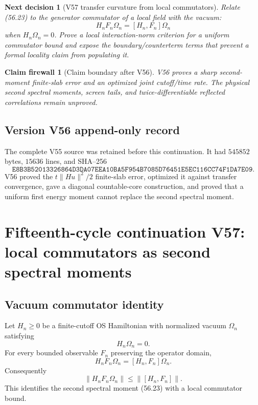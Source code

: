 \documentclass[11pt]{article}
\newtheorem{firewall}[theorem]{Claim firewall}
\newtheorem{decision}[theorem]{Next decision}
\theoremstyle{remark}
\begin{document}
\begin{decision}[V57 transfer curvature from local commutators]
\label{dec:v15v56-next}
Relate (56.23) to the generator commutator of a local field with the
vacuum:
\[
 H_nF_n\Omega_n=[H_n,F_n]\Omega_n
\]
when \(H_n\Omega_n=0\).  Prove a local interaction-norm criterion
for a uniform commutator bound and expose the boundary/counterterm
terms that prevent a formal locality claim from populating it.
\end{decision}

\begin{firewall}[Claim boundary after V56]
\label{fire:v15v56}
V56 proves a sharp second-moment finite-slab error and an optimized
joint cutoff/time rate.  The physical second spectral moments,
screen tails, and twice-differentiable reflected correlations remain
unproved.
\end{firewall}

\section*{Version V56 append-only record}
The complete V55 source was retained before this continuation.  It
had \(545852\) bytes, \(15636\) lines, and SHA--256
\[
 \texttt{E8B3B52013326864D3DA07EEA10BA5F954B7085D76451E5EC116CC74F1DA7E09}.
\]
V56 proved the \(t\|Hu\|^2/2\) finite-slab error, optimized it
against transfer convergence, gave a diagonal countable-core
construction, and proved that a uniform first energy moment cannot
replace the second spectral moment.

\chapter{Fifteenth-cycle continuation V57: local commutators as second spectral moments}
\label{sec:v15v57}

\section{Vacuum commutator identity}

Let \(H_n\geq0\) be a finite-cutoff OS Hamiltonian with normalized
vacuum \(\Omega_n\) satisfying
\[
 H_n\Omega_n=0.                                         \tag{57.1}
\]
For every bounded observable \(F_n\) preserving the operator domain,
\[
 \boxed{
 H_nF_n\Omega_n=[H_n,F_n]\Omega_n.}                     \tag{57.2}
\]
Consequently
\[
 \|H_nF_n\Omega_n\|
 \leq\|[H_n,F_n]\|.                                     \tag{57.3}
\]
This identifies the second spectral moment (56.23) with a local
commutator bound.
\end{document}

